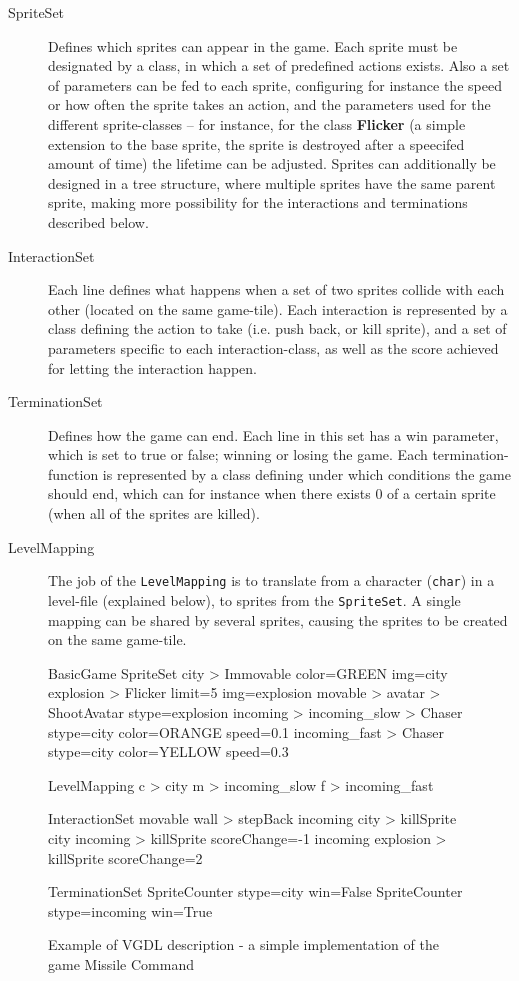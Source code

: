 \documentclass[a4paper,titlepage,final, twoside]{report}
\begin{document}
\begin{description}
\item [SpriteSet] Defines which sprites can appear in the game. Each sprite must be designated by a class, in which a set of predefined actions exists. Also a set of parameters can be fed to each sprite, configuring for instance the speed or how often the sprite takes an action, and the parameters used for the different sprite-classes -- for instance, for the  class \textbf{Flicker} (a simple extension to the base sprite, the sprite is destroyed after a speecifed amount of time) the lifetime can be adjusted.
Sprites can additionally be designed in a tree structure, where multiple sprites have the same parent sprite, making more possibility for the interactions and terminations described below. 
\item [InteractionSet] Each line defines what happens when a set of two sprites collide with each other (located on the same game-tile). Each interaction is represented by a class defining the action to take (i.e. push back, or kill sprite), and a set of parameters specific to each interaction-class, as well as the score achieved for letting the interaction happen.
\item [TerminationSet] Defines how the game can end. Each line in this set has a win parameter, which is set to true or false; winning or losing the game.
Each termination-function is represented by a class defining under which conditions the game should end, which can for instance when there exists 0 of a certain sprite (when all of the sprites are killed).
\item [LevelMapping] The job of the \texttt{LevelMapping} is to translate from a character (\texttt{char}) in a level-file (explained below), to sprites from the \texttt{SpriteSet}. 
A single mapping can be shared by several sprites, causing the sprites to be created on the same game-tile.
\end{description}



\begin{figure}[!ht]
\centering
\begin{vgdldesc}[linewidth=14cm]
BasicGame
	SpriteSet
		city  > Immovable color=GREEN img=city
		explosion > Flicker limit=5 img=explosion
		movable >
			avatar  > ShootAvatar stype=explosion
			incoming >
				incoming_slow  > Chaser stype=city color=ORANGE speed=0.1
				incoming_fast  > Chaser stype=city color=YELLOW speed=0.3

	LevelMapping
		c > city
		m > incoming_slow
		f > incoming_fast
		
	InteractionSet
		movable wall  > stepBack
		incoming city > killSprite
		city incoming > killSprite scoreChange=-1
		incoming explosion > killSprite scoreChange=2

	TerminationSet
		SpriteCounter stype=city   win=False
		SpriteCounter stype=incoming win=True
\end{vgdldesc}
\caption{Example of VGDL description - a simple implementation of the game Missile Command}
\label{fig:vgdl}
\end{figure}
\end{document}
